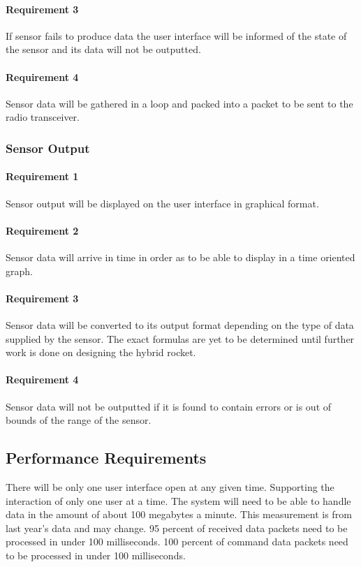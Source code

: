 \documentclass[10pt,draftclsnofoot,onecolumn,compsoc]{IEEEtran}
\begin{document}
	\paragraph{ Requirement 3}If sensor fails to produce data the user interface will be informed of the state of the sensor and its data will not be outputted.\par
	\paragraph{ Requirement 4}Sensor data will be gathered in a loop and packed into a packet to be sent to the radio transceiver.\par
\subsubsection{Sensor Output}
	\paragraph{ Requirement 1}Sensor output will be displayed on the user interface in graphical format.\par
	\paragraph{ Requirement 2}Sensor data will arrive in time in order as to be able to display in a time oriented graph.\par
	\paragraph{ Requirement 3}Sensor data will be converted to its output format depending on the type of data supplied by the sensor. The exact formulas are yet to be determined until further work is done on designing the hybrid rocket.\par
	\paragraph{ Requirement 4}Sensor data will not be outputted if it is found to contain errors or is out of bounds of the range of the sensor.\par

\subsection{ Performance Requirements}
There will be only one user interface open at any given time. Supporting the interaction of only one user at a time. The system will need to be able to handle data in the amount of about 100 megabytes a minute. This measurement is from last year’s data and may change. 95 percent of received data packets need to be processed in under 100 milliseconds. 100 percent of command data packets need to be processed in under 100 milliseconds.
\end{document}
